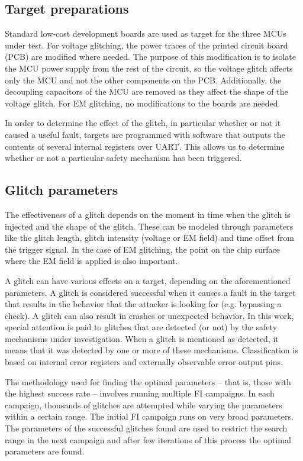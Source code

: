 \documentclass[10pt, conference, compsocconf]{IEEEtran}
\begin{document}
\subsection{Target preparations}
Standard low-cost development boards are used as target for the three MCUs under test. For voltage glitching, the power traces of the printed circuit board (PCB) are modified where needed. The purpose of this modification is to isolate the MCU power supply from the rest of the circuit, so the voltage glitch affects only the MCU and not the other components on the PCB. Additionally, the decoupling capacitors of the MCU are removed as they affect the shape of the voltage glitch. For EM glitching, no modifications to the boards are needed.

In order to determine the effect of the glitch, in particular whether or not it caused a useful fault, targets are programmed with software that outputs the contents of several internal registers over UART. This allows us to determine whether or not a particular safety mechanism has been triggered. 

\subsection{Glitch parameters}
The effectiveness of a glitch depends on the moment in time when the glitch is injected and the shape of the glitch. These can be modeled through parameters like the glitch length, glitch intensity (voltage or EM field) and time offset from the trigger signal. In the case of EM glitching, the point on the chip surface where the EM field is applied is also important.

A glitch can have various effects on a target, depending on the aforementioned parameters. A glitch is considered successful when it causes a fault in the target that results in the behavior that the attacker is looking for (e.g. bypassing a check). A glitch can also result in crashes or unexpected behavior. In this work, special attention is paid to glitches that are detected (or not) by the safety mechanisms under investigation. When a glitch is mentioned as detected, it means that it was detected by one or more of these mechanisms. Classification is based on internal error registers and externally observable error output pins.

The methodology used for finding the optimal parameters -- that is, those with the highest success rate -- involves running multiple FI campaigns. In each campaign, thousands of glitches are attempted while varying the parameters within a certain range. The initial FI campaign runs on very broad parameters. The parameters of the successful glitches found are used to restrict the search range in the next campaign and after few iterations of this process the optimal parameters are found.
\end{document}
